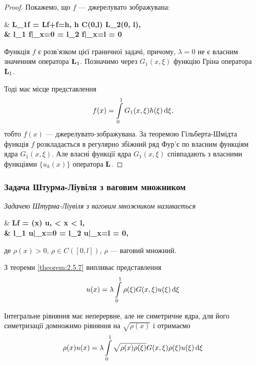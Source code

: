 \begin{proof}
	Покажемо, що $f$ --- джерелувато зображувана:
	\begin{system}
		& \bf{L}_1f = \bf{L}f+f=h, \quad h \in C(0,l) \cap L_2(0, l), \\
		& l_1 f|_{x=0} = l_2 f|_{x=l} = 0
	\end{system}

	Функція $f$ є розв'язком цієї граничної задачі, причому, $\lambda = 0$ не є власним значенням оператора $\bf{L}_1$. Позначимо через $G_1(x, \xi)$ функцію Гріна оператора $\bf{L}_1$. \medskip

	Тоді має місце представлення
	\begin{equation}
		f(x) = \Int_0^1 G_1(x, \xi) h(\xi) \diff \xi,
	\end{equation}
	тобто $f(x)$ --- джерелувато-зображувана. За теоремою Гільберта-Шмідта функція $f$ розкладається в регулярно збіжний ряд Фур'є по власним функціям ядра $G_1(x, \xi)$. Але власні функції ядра $G_1(x, \xi)$ співпадають з власними функціями $\{u_k(x)\}$ оператора $\bf{L}$.
\end{proof}

\subsubsection{Задача Штурма-Ліувіля з ваговим множником}

\begin{definition}
	\it{Задачею Штурма-Ліувіля з ваговим множником} називається
	\begin{system}
		& \bf{L}f = \lambda \rho(x) u,  < x < l, \\
		& l_1 u|_{x=0} = l_2 u|_{x=l} = 0,
	\end{system}
	де $\rho(x) > 0$, $\rho \in C([0, l])$, $\rho$ --- ваговий множний.
\end{definition}

З теореми \ref{theorem:2.5.7} випливає представлення
\begin{equation}
	u(x) = \lambda \Int_0^1 \rho(\xi) G(x, \xi) u(\xi) \diff \xi
\end{equation}

Інтегральне рівняння має неперервне, але не симетричне ядра, для його симетризації домножимо рівняння на $\sqrt{\rho(x)}$ і отримаємо
\begin{equation}
	\rho(x)u(x) = \lambda \Int_0^1 \sqrt{\rho(x)\rho(\xi)} G(x, \xi) \rho(\xi)u(\xi) \diff \xi
\end{equation}

